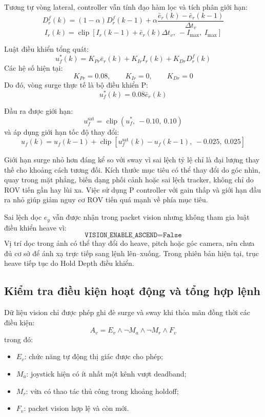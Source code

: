\documentclass[../DoAn.tex]{subfiles}
\begin{document}
Tương tự vòng lateral, controller vẫn tính đạo hàm lọc và tích phân giới hạn:
\[
D_r^f(k) = (1-\alpha)D_r^f(k-1) + \alpha \frac{\bar{e}_r(k)-\bar{e}_r(k-1)}{\Delta t_v}
\]
\[
I_r(k) = \operatorname{clip}\left[ I_r(k-1)+\bar{e}_r(k)\Delta t_v,\ -I_{\max},\ I_{\max} \right]
\]

Luật điều khiển tổng quát:
\[
u_f^{*}(k) = K_{Pr}\bar{e}_r(k) + K_{Ir}I_r(k) + K_{Dr}D_r^f(k)
\]
Các hệ số hiện tại:
\[
K_{Pr} = 0.08, \qquad K_{Ir} = 0, \qquad K_{Dr} = 0
\]
Do đó, vòng surge thực tế là bộ điều khiển P:
\[
u_f^{*}(k) = 0.08 \bar{e}_r(k)
\]

Đầu ra được giới hạn:
\[
u_f^{\mathrm{sat}} = \operatorname{clip}\left(u_f^{*},\ -0.10,\ 0.10\right)
\]
và áp dụng giới hạn tốc độ thay đổi:
\[
u_f(k) = u_f(k-1) + \operatorname{clip}\left[ u_f^{\mathrm{sat}}(k)-u_f(k-1),\ -0.025,\ 0.025 \right]
\]

Giới hạn surge nhỏ hơn đáng kể so với sway vì sai lệch tỷ lệ chỉ là đại lượng thay thế cho khoảng cách tương đối. Kích thước mục tiêu có thể thay đổi do góc nhìn, quay trong mặt phẳng, biến dạng phối cảnh hoặc sai lệch tracker, không chỉ do ROV tiến gần hay lùi xa. Việc sử dụng P controller với gain thấp và giới hạn đầu ra nhỏ giúp giảm nguy cơ ROV tiến quá mạnh về phía mục tiêu.

Sai lệch dọc $e_y$ vẫn được nhận trong packet vision nhưng không tham gia luật điều khiển heave vì:
\[
\texttt{VISION\_ENABLE\_ASCEND} = \texttt{False}
\]
Vị trí dọc trong ảnh có thể thay đổi do heave, pitch hoặc góc camera, nên chưa đủ cơ sở để ánh xạ trực tiếp sang lệnh lên--xuống. Trong phiên bản hiện tại, trục heave tiếp tục do Hold Depth điều khiển.

\subsection{Kiểm tra điều kiện hoạt động và tổng hợp lệnh}

Dữ liệu vision chỉ được phép ghi đè surge và sway khi thỏa mãn đồng thời các điều kiện:
\[
A_v = E_v \land \neg M_a \land \neg M_r \land F_v
\]
trong đó:
\begin{itemize}
    \item $E_v$: chức năng tự động thị giác được cho phép;
    \item $M_a$: joystick hiện có ít nhất một kênh vượt deadband;
    \item $M_r$: vừa có thao tác thủ công trong khoảng holdoff;
    \item $F_v$: packet vision hợp lệ và còn mới.
\end{itemize}
\end{document}

